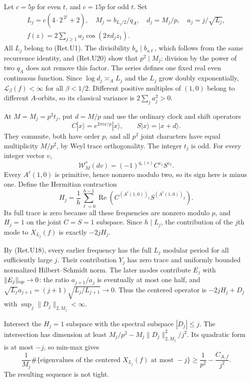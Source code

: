 Let \(c=5p\) for even \(t\), and \(c=15p\) for odd \(t\). Set
\[
 \begin{gathered}
 L_j=c(4\cdot2^{\,2^j}+2),\quad
 M_j=b_{L_j/2}/q_A,\quad d_j=M_j/p,\quad a_j=j/\sqrt{L_j},
 \\ f(z)=2\sum_{j\ge1}a_j\cos(2\pi d_jz_1).
 \end{gathered}                                          \tag{Ret.U21}
\]
All \(L_j\) belong to (Ret.U1). The divisibility \(b_u\mid b_{u\ell}\),
which follows from the same recurrence identity, and (Ret.U20)
show that \(p^2\mid M_j\); division by the power of two \(q_A\)
does not remove this factor.
The series defines one fixed real even continuous function.
Since \(\log d_j\asymp_A L_j\) and the \(L_j\) grow doubly
exponentially, \(\mathcal L_\beta(f)<\infty\) for all \(\beta<1/2\).
Different positive multiples of \((1,0)\) belong to different
\(A\)-orbits, so its classical variance is \(2\sum_j a_j^2>0\).

At \(M=M_j=p^2t_j\), put \(d=M/p\) and use the ordinary clock and
shift operators
\[
             C|x\rangle=e^{2\pi ix/p}|x\rangle,\qquad
             S|x\rangle=|x+d\rangle .
\]
They commute, both have order \(p\), and all \(p^2\) joint characters
have equal multiplicity \(M/p^2\), by Weyl trace orthogonality.
The integer \(t_j\) is odd. For every integer vector \(v\),
\[
                  \mathcal W_M^*(dv)=(-1)^{q_*(v)}C^{v_1}S^{v_2}.
\]
Every \(A^\ell(1,0)\) is primitive, hence nonzero modulo two,
so its sign here is minus one. Define the Hermitian contraction
\[
 H_j=\frac1h\sum_{\ell=0}^{h-1}
       \operatorname{Re}\left(C^{(A^\ell(1,0))_1}
                             S^{(A^\ell(1,0))_2}\right).
                                                               \tag{Ret.U22}
\]
Its full trace is zero because all these frequencies are nonzero
modulo \(p\), and \(H_j=1\) on the joint \(C=S=1\) subspace.
Since \(h\mid L_j\), the contribution of the \(j\)th mode to
\(X_{L_j}(f)\) is exactly \(-2jH_j\).

By (Ret.U18), every earlier frequency has the full \(L_j\) modular period
for all sufficiently large \(j\). Their contribution \(Y_j\) has
zero trace and uniformly bounded normalized Hilbert--Schmidt norm.
The later modes contribute \(E_j\) with \(\|E_j\|_{\rm op}\to0\):
the ratio \(a_{j+1}/a_j\) is eventually at most one half, and
\(\sqrt{L_j}a_{j+1}=(j+1)\sqrt{L_j/L_{j+1}}\to0\).
Thus the centered operator is \(-2jH_j+D_j\) with
\(\sup_j\|D_j\|_{2,M_j}<\infty\).

Intersect the \(H_j=1\) subspace with the spectral subspace
\(|D_j|\le j\). The intersection has dimension at least
\(M_j/p^2-M_j\|D_j\|_{2,M_j}^2/j^2\).
Its quadratic form is at most \(-j\), so min-max gives
\[
 \frac1{M_j}\#\{\text{eigenvalues of the centered }
                  X_{L_j}(f)\text{ at most }-j\}
                    \ge\frac1{p^2}-\frac{C_{A,f}}{j^2}.  \tag{Ret.U23}
\]
The resulting sequence is not tight.

